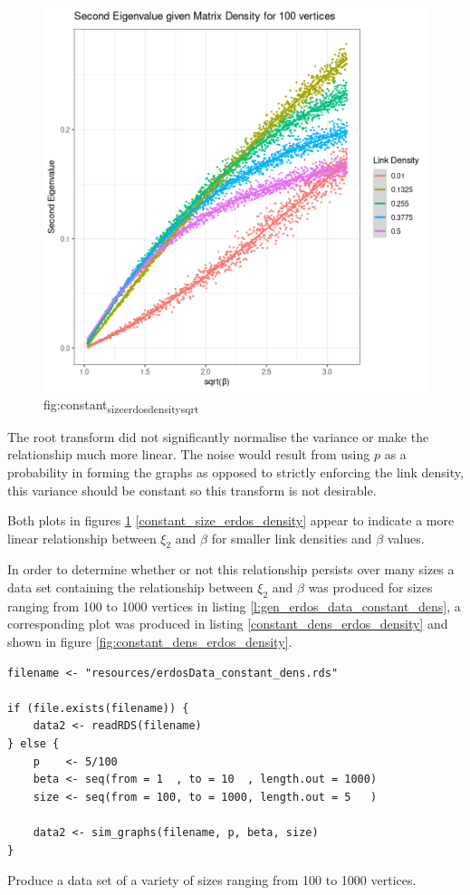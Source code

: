 \documentclass[11pt]{article}
\begin{document}
\begin{figure}[htbp]
\centering
\includegraphics[width=12cm]{media/constant_size_erdos_density_sqrt.png}
\caption{\label{fig:constant_size_erdos_density_sqrt}fig:constant\textsubscript{size}\textsubscript{erdos}\textsubscript{density}\textsubscript{sqrt}}
\end{figure}


The root transform did not significantly normalise the variance or make the
relationship much more linear. The noise would result from using \(p\) as a
probability in forming the graphs as opposed to strictly enforcing the link
density, this variance should be constant so this transform is not desirable.

Both plots in figures
\ref{fig:constant_size_erdos_density_sqrt}
\ref{constant_size_erdos_density}
appear to indicate a more linear relationship between \(\xi_{2}\) and \(\beta\) for smaller link densities and \(\beta\) values.


In order to determine whether or not this relationship persists over many sizes a data set containing the relationship between \(\xi_{2}\) and \(\beta\) was produced for sizes ranging from 100 to 1000 vertices in listing \ref{l:gen_erdos_data_constant_dens}, a corresponding plot was produced in listing \ref{constant_dens_erdos_density} and shown in figure \ref{fig:constant_dens_erdos_density}.


\begin{listing}[htbp]
\begin{verbatim}
filename <- "resources/erdosData_constant_dens.rds"

if (file.exists(filename)) {
    data2 <- readRDS(filename)
} else {
    p    <- 5/100
    beta <- seq(from = 1  , to = 10  , length.out = 1000)
    size <- seq(from = 100, to = 1000, length.out = 5   )

    data2 <- sim_graphs(filename, p, beta, size)
}
\end{verbatim}
\caption{\label{l:gen_erdos_data_constant_dens}Produce a data set of a variety of sizes ranging from 100 to 1000 vertices.}
\end{listing}
\end{document}
